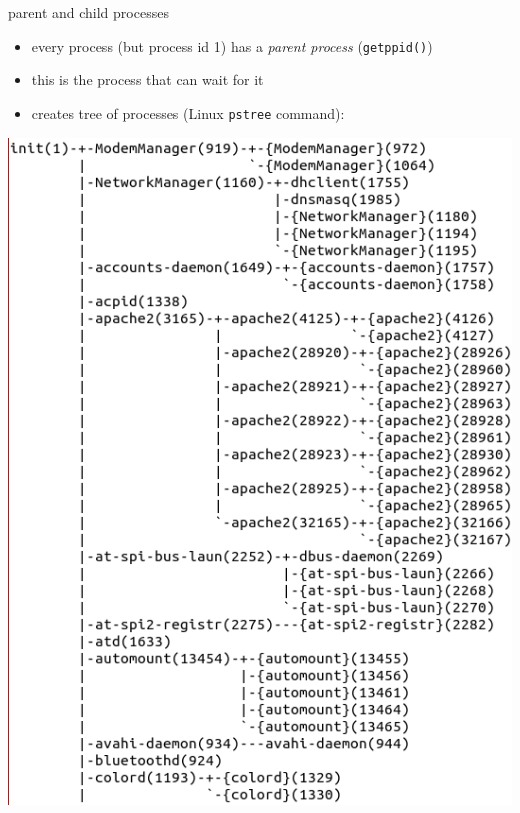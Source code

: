 \begin{frame}{parent and child processes}
\begin{itemize}
    \item every process (but process id 1) has a \textit{parent process} (\texttt{getppid()})
    \item this is the process that can wait for it
    \item creates tree of processes (Linux \texttt{pstree} command):
\end{itemize}
    \includegraphics[height=0.6\textheight]{../unix-api/process-tree}

\end{frame}
